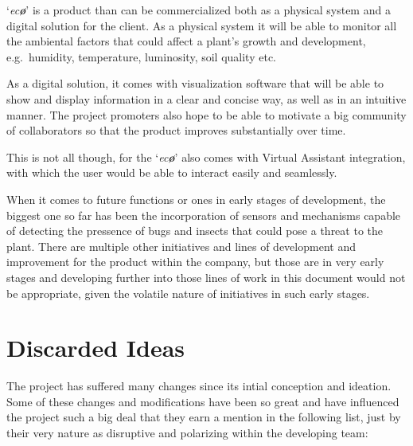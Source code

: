 \documentclass[english,runningheads,a4paper]{llncs}[2018/03/10]
\begin{document}
`\textit{ec\textbf{\o}}' is a product than can be commercialized both as a
physical system and a digital solution for the client. As a physical system it
will be able to monitor all the ambiental factors that could affect a plant's
growth and development, e.g.\ humidity, temperature, luminosity, soil quality
etc.

As a digital solution, it comes with visualization software that will be able to
show and display information in a clear and concise way, as well as in an
intuitive manner. The project promoters also hope to be able to motivate a big
community of collaborators so that the product improves substantially over time.

This is not all though, for the `\textit{ec\textbf{\o}}' also comes with Virtual
Assistant integration, with which the user would be able to interact easily and
seamlessly.

When it comes to future functions or ones in early stages of development, the
biggest one so far has been the incorporation of sensors and mechanisms capable
of detecting the pressence of bugs and insects that could pose a threat to the
plant. There are multiple other initiatives and lines of development and
improvement for the product within the company, but those are in very early
stages and developing further into those lines of work in this document would
not be appropriate, given the volatile nature of initiatives in such early
stages.


\section*{Discarded Ideas}

The project has suffered many changes since its intial conception and ideation.
Some of these changes and modifications have been so great and have influenced
the project such a big deal that they earn a mention in the following list, just
by their very nature as disruptive and polarizing within the developing team:
\end{document}
